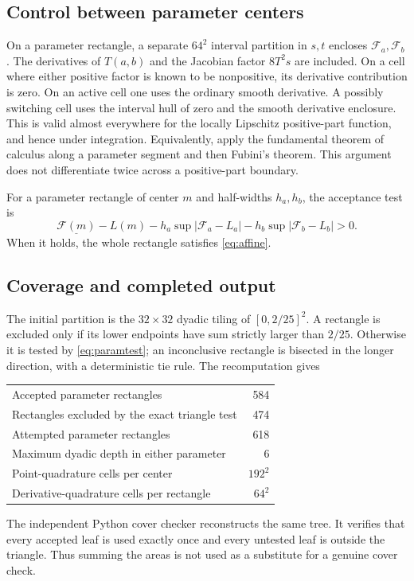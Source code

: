 \documentclass[11pt]{article}
\numberwithin{equation}{section}
\theoremstyle{definition}\newtheorem{definition}[theorem]{Definition}
\theoremstyle{remark}\newtheorem{remark}[theorem]{Remark}
\begin{document}
\subsection{Control between parameter centers}
On a parameter rectangle, a separate $64^2$ interval partition in $s,t$
encloses $\mathcal F_a,\mathcal F_b$. The derivatives of $T(a,b)$ and the
Jacobian factor $8T^2s$ are included. On a cell where either positive factor
is known to be nonpositive, its derivative contribution is zero. On an
active cell one uses the ordinary smooth derivative. A possibly switching
cell uses the interval hull of zero and the smooth derivative enclosure.
This is valid almost everywhere for the locally Lipschitz positive-part
function, and hence under integration. Equivalently, apply the fundamental
theorem of calculus along a parameter segment and then Fubini's theorem.
This argument does not differentiate twice across a positive-part boundary.

For a parameter rectangle of center $m$ and half-widths $h_a,h_b$, the
acceptance test is
\begin{equation}\label{eq:paramtest}
 \underline{\mathcal F(m)}-L(m)
 -h_a\sup|\mathcal F_a-L_a|
 -h_b\sup|\mathcal F_b-L_b|>0.
\end{equation}
When it holds, the whole rectangle satisfies \cref{eq:affine}.

\subsection{Coverage and completed output}
The initial partition is the $32\times32$ dyadic tiling of $[0,2/25]^2$.
A rectangle is excluded only if its lower endpoints have sum strictly larger
than $2/25$. Otherwise it is tested by \cref{eq:paramtest}; an inconclusive
rectangle is bisected in the longer direction, with a deterministic tie rule.
The recomputation gives
\begin{center}
\begin{tabular}{@{}lr@{}}
\toprule
Accepted parameter rectangles & 584\\
Rectangles excluded by the exact triangle test & 474\\
Attempted parameter rectangles & 618\\
Maximum dyadic depth in either parameter & 6\\
Point-quadrature cells per center & $192^2$\\
Derivative-quadrature cells per rectangle & $64^2$\\
\bottomrule
\end{tabular}
\end{center}
The independent Python cover checker reconstructs the same tree. It verifies
that every accepted leaf is used exactly once and every untested leaf is
outside the triangle. Thus summing the areas is not used as a substitute
for a genuine cover check.
\end{document}
